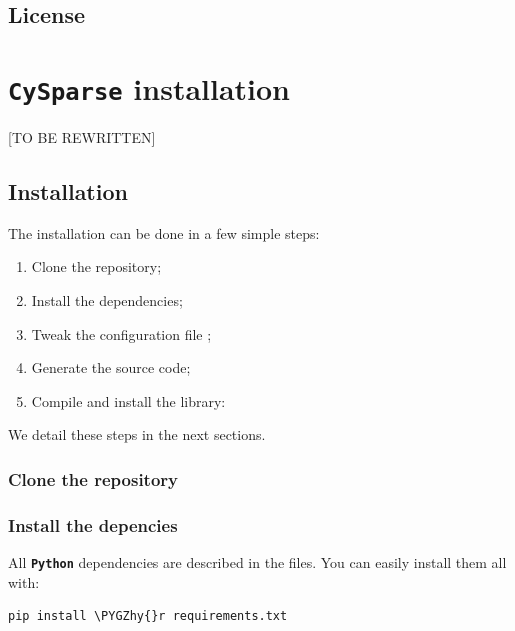 \documentclass[letterpaper,10pt,english]{sphinxmanual}
\def\PYGZhy{\char`\-}
\begin{document}
\section{License}
\label{introduction:license}

\chapter{\textbf{\texttt{CySparse}} installation}
\label{installation:cysparse-installation}\label{installation::doc}
{[}TO BE REWRITTEN{]}


\section{Installation}
\label{installation:installation}
The installation can be done in a few simple steps:
\begin{enumerate}
\item {} 
Clone the repository;

\item {} 
Install the dependencies;

\item {} 
Tweak the configuration file ;

\item {} 
Generate the source code;

\item {} 
Compile and install the library:

\end{enumerate}

We detail these steps in the next sections.


\subsection{Clone the repository}
\label{installation:clone-the-repository}

\subsection{Install the depencies}
\label{installation:install-the-depencies}
All \textbf{\texttt{Python}} dependencies are described in the  files. You can easily install them all with:

\begin{Verbatim}[commandchars=\\\{\}]
pip install \PYGZhy{}r requirements.txt
\end{Verbatim}
\end{document}

